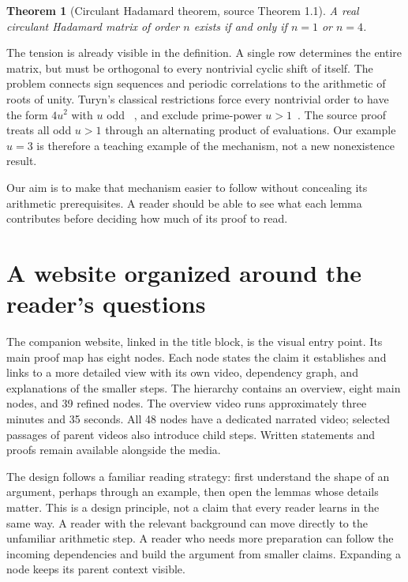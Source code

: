 \documentclass[11pt]{article}
\newtheorem{theorem}{Theorem}
\begin{document}
\begin{theorem}[Circulant Hadamard theorem, source Theorem 1.1]%
\label{thm:main}
A real circulant Hadamard matrix of order $n$ exists if and only if
$n=1$ or $n=4$.
\end{theorem}

The tension is already visible in the definition. A single row determines
the entire matrix, but must be orthogonal to every nontrivial cyclic shift
of itself. The problem connects sign sequences and periodic correlations
to the arithmetic of roots of unity. Turyn's classical restrictions force
every nontrivial order to have the form $4u^{2}$ with $u$ odd~%
\cite[Theorem~8 and its corollary, pp.~335--336]{turyn1965}, and exclude
prime-power $u>1$~\cite[Corollary~2 to Theorem~6, p.~333]{turyn1965}.
The source proof treats all odd $u>1$ through an alternating product of
evaluations. Our example $u=3$ is therefore a teaching example of the
mechanism, not a new nonexistence result.

Our aim is to make that mechanism easier to follow without concealing its
arithmetic prerequisites. A reader should be able to see what each lemma
contributes before deciding how much of its proof to read.

\section{A website organized around the reader's questions}%
\label{sec:website}

The companion website, linked in the title block, is the visual entry
point. Its main proof map has eight nodes. Each node states the claim it
establishes and links to a more detailed view with its own video, dependency
graph, and explanations of the smaller steps. The hierarchy contains an
overview, eight main nodes, and 39 refined nodes. The overview video runs
approximately three minutes and 35 seconds. All 48 nodes have a dedicated
narrated video; selected passages of parent videos also introduce child
steps. Written statements and proofs remain available alongside the media.

The design follows a familiar reading strategy: first understand the shape
of an argument, perhaps through an example, then open the lemmas whose
details matter. This is a design principle, not a claim that every reader
learns in the same way. A reader with the relevant background can move
directly to the unfamiliar arithmetic step. A reader who needs more
preparation can follow the incoming dependencies and build the argument
from smaller claims. Expanding a node keeps its parent context visible.
\end{document}
